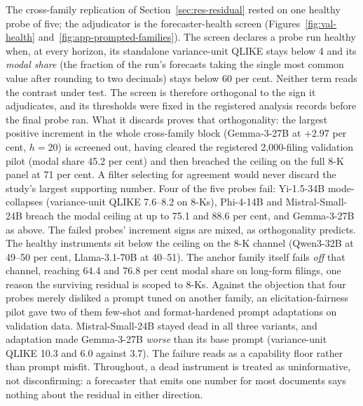 The cross-family replication of Section~\ref{sec:res-residual} rested on one healthy probe of five; the adjudicator is the forecaster-health screen (Figures~\ref{fig:val-health} and~\ref{fig:app-prompted-families}). The screen declares a probe run healthy when, at every horizon, its standalone variance-unit QLIKE stays below 4 and its \emph{modal share} (the fraction of the run's forecasts taking the single most common value after rounding to two decimals) stays below 60 per cent. %
Neither term reads the contrast under test. The screen is therefore orthogonal to the sign it adjudicates, and its thresholds were fixed in the registered analysis records before the final probe ran. %
What it discards proves that orthogonality: the largest positive increment in the whole cross-family block (Gemma-3-27B at $+2.97$ per cent, $h{=}20$) is screened out, having cleared the registered 2{,}000-filing validation pilot (modal share 45.2 per cent) and then breached the ceiling on the full 8-K panel at 71 per cent. A filter selecting for agreement would never discard the study's largest supporting number. %
Four of the five probes fail: Yi-1.5-34B mode-collapses (variance-unit QLIKE 7.6--8.2 on 8-Ks), Phi-4-14B and Mistral-Small-24B breach the modal ceiling at up to 75.1 and 88.6 per cent, and Gemma-3-27B as above. The failed probes' increment signs are mixed, as orthogonality predicts. %
The healthy instruments sit below the ceiling on the 8-K channel (Qwen3-32B at 49--50 per cent, Llama-3.1-70B at 40--51). The anchor family itself fails \emph{off} that channel, reaching 64.4 and 76.8 per cent modal share on long-form filings, one reason the surviving residual is scoped to 8-Ks. %
Against the objection that four probes merely disliked a prompt tuned on another family, an elicitation-fairness pilot gave two of them few-shot and format-hardened prompt adaptations on validation data. Mistral-Small-24B stayed dead in all three variants, and adaptation made Gemma-3-27B \emph{worse} than its base prompt (variance-unit QLIKE 10.3 and 6.0 against 3.7). The failure reads as a capability floor rather than prompt misfit. %
Throughout, a dead instrument is treated as uninformative, not disconfirming: a forecaster that emits one number for most documents says nothing about the residual in either direction.

